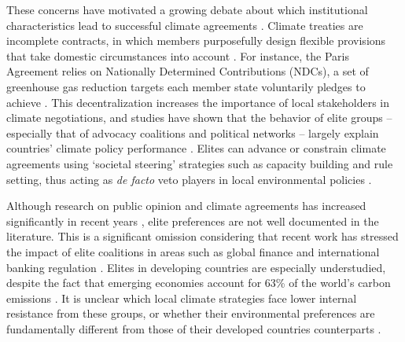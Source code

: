 \documentclass[a4paper,12pt]{article}
\begin{document}
These concerns have motivated a growing debate about which institutional characteristics lead to successful climate agreements \citep[e.g.,][]{bechtel2013mass, bechtel2017interests, keohane2011regime, mitchell2006problem, ostrom2014polycentric}. Climate treaties are incomplete contracts, in which members purposefully design flexible provisions that take domestic circumstances into account \citep[607]{brauninger2000making}. For instance, the Paris Agreement relies on Nationally Determined Contributions (NDCs), a set of greenhouse gas reduction targets each member state voluntarily pledges to achieve \citep{winning2019nationally}. This decentralization increases the importance of local stakeholders in climate negotiations, and studies have shown that the behavior of elite groups -- especially that of advocacy coalitions and political networks -- largely explain countries' climate policy performance \citep{jahn2016politics, karapin2012explaining}. Elites can advance or constrain climate agreements using `societal steering' strategies such as capacity building and rule setting, thus acting as \textit{de facto} veto players in local environmental policies \citep{andonova2009transnational, bulkeley2014transnational}.

Although research on public opinion and climate agreements has increased significantly in recent years \citep[e.g.,][]{aklin2013understanding, bechtel2013mass, bechtel2017interests, mildenberger2017beliefs}, elite preferences are not well documented in the literature. This is a significant omission considering that recent work has stressed the impact of elite coalitions in areas such as global finance and international banking regulation \citep[e.g,][]{chalmers2017banks, pagliari2014leveraged}. Elites in developing countries are especially understudied, despite the fact that emerging economies account for 63\% of the world's carbon emissions \citep{busch2015developing}. It is unclear which local climate strategies face lower internal resistance from these groups, or whether their environmental preferences are fundamentally different from those of their developed countries counterparts \citep[28]{aklin2013understanding}.
\end{document}

